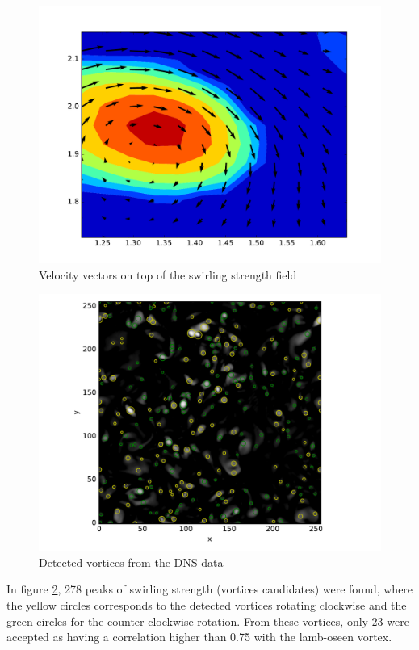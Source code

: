 \documentclass[12pt, a4paper, openany]{memoir}
\begin{document}
\begin{figure}[h]
	\centering
	\includegraphics[scale=0.6]{figure/dns_quiver1.pdf}
	\caption{Velocity vectors on top of the swirling strength field}
	\label{fig:quiverDNS1}
\end{figure}

\begin{figure}[h]
	\centering
	\includegraphics[scale=0.6]{figure/dns_detect.pdf}
	\caption{Detected vortices from the DNS data}
	\label{fig:detectionDNS}
\end{figure}

In figure \ref{fig:detectionDNS}, 278 peaks of swirling strength (vortices candidates) were found, where the yellow circles corresponds to the detected vortices rotating clockwise and the green circles for the counter-clockwise rotation. From these vortices, only 23 were accepted as having a correlation higher than 0.75 with the lamb-oseen vortex.
\end{document}
